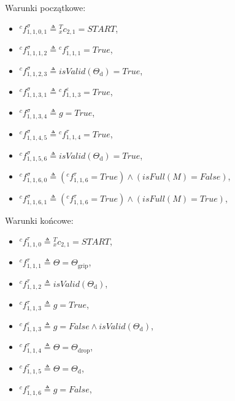 Warunki początkowe:
\begin{itemize}
    \item ${}^{c}f^{\sigma}_{1,1,0,1} \triangleq {}^{T}_{x}c_{2,1} = START$,
    \item ${}^{c}f^{\sigma}_{1,1,1,2} \triangleq {}^{c}f^{\tau}_{1,1,1} = True$,
    \item ${}^{c}f^{\sigma}_{1,1,2,3} \triangleq isValid(\Theta_{\mathrm{d}}) = True$,
    \item ${}^{c}f^{\sigma}_{1,1,3,1} \triangleq {}^{c}f^{\varepsilon}_{1,1,3} = True$,
    \item ${}^{c}f^{\sigma}_{1,1,3,4} \triangleq g = True$,
    \item ${}^{c}f^{\sigma}_{1,1,4,5} \triangleq {}^{c}f^{\tau}_{1,1,4} = True$,
    \item ${}^{c}f^{\sigma}_{1,1,5,6} \triangleq isValid(\Theta_{\mathrm{d}}) = True$,
    \item ${}^{c}f^{\sigma}_{1,1,6,0} \triangleq ({}^{c}f^{\tau}_{1,1,6} = True) \land (isFull(M) = False)$,
    \item ${}^{c}f^{\sigma}_{1,1,6,1} \triangleq ({}^{c}f^{\tau}_{1,1,6} = True) \land (isFull(M) = True)$,
\end{itemize}

Warunki końcowe:
\begin{itemize}
    \item ${}^{c}f^{\tau}_{1,1,0} \triangleq {}^{T}_{x}c_{2,1} = START $,
    \item ${}^{c}f^{\tau}_{1,1,1} \triangleq \Theta = \Theta_{\mathrm{grip}}$,
    \item ${}^{c}f^{\tau}_{1,1,2} \triangleq isValid(\Theta_{\mathrm{d}})$,
    \item ${}^{c}f^{\tau}_{1,1,3} \triangleq g = True$,
    \item ${}^{c}f^{\varepsilon}_{1,1,3} \triangleq g = False \land isValid(\Theta_{\mathrm{d}})$,
    \item ${}^{c}f^{\tau}_{1,1,4} \triangleq \Theta = \Theta_{\mathrm{drop}}$,
    \item ${}^{c}f^{\tau}_{1,1,5} \triangleq \Theta = \Theta_{\mathrm{d}}$,
    \item ${}^{c}f^{\tau}_{1,1,6} \triangleq g = False$,
\end{itemize}


